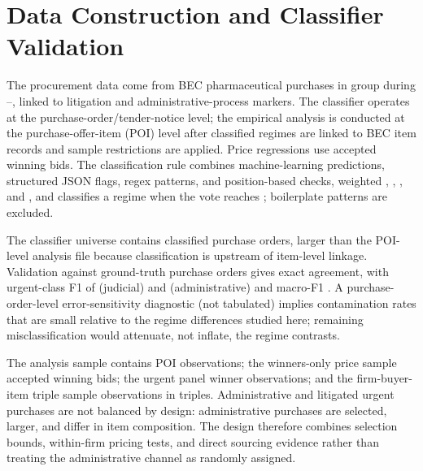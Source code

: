 \section{Data Construction and Classifier Validation}
\label{app:classifier}

The procurement data come from BEC pharmaceutical purchases in group \BPbecGroup{} during \BPsampleStartYear--\BPsampleEndYear{}, linked to litigation and administrative-process markers. The classifier operates at the purchase-order/tender-notice level; the empirical analysis is conducted at the purchase-offer-item (POI) level after classified regimes are linked to BEC item records and sample restrictions are applied. Price regressions use accepted winning bids. The classification rule combines machine-learning predictions, structured JSON flags, regex patterns, and position-based checks, weighted \BPclfWeightML{}, \BPclfWeightJSON{}, \BPclfWeightRegex{}, and \BPclfWeightPosition{}, and classifies a regime when the vote reaches \BPclfVoteThreshold{}; \BPclfNPatternsBoiler{} boilerplate patterns are excluded.



The classifier universe contains \BPregexNClassified{} classified purchase orders, larger than the \BPnPOIfull{} POI-level analysis file because classification is upstream of item-level linkage. Validation against \BPregexNGroundTruth{} ground-truth purchase orders gives \BPregexExactMatchPct{} exact agreement, with urgent-class F1 of \BPregexFoneJud{} (judicial) and \BPregexFoneAdm{} (administrative) and macro-F1 \BPregexFone{}. A purchase-order-level error-sensitivity diagnostic (not tabulated) implies contamination rates that are small relative to the regime differences studied here; remaining misclassification would attenuate, not inflate, the regime contrasts.



The analysis sample contains \BPnAnalysisSample{} POI observations; the winners-only price sample \BPnegNobs{} accepted winning bids; the urgent panel \BPnUTG{} winner observations; and the firm-buyer-item triple sample \BPutgTripleNUTG{} observations in \BPutgTripleCountUTG{} triples. Administrative and litigated urgent purchases are not balanced by design: administrative purchases are selected, larger, and differ in item composition. The design therefore combines selection bounds, within-firm pricing tests, and direct sourcing evidence rather than treating the administrative channel as randomly assigned.

